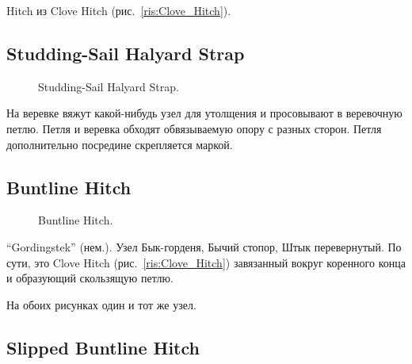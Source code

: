 Hitch из Clove Hitch (рис.~\ref{ris:Clove_Hitch}).

\subsection{Studding-Sail Halyard Strap}

\begin{figure}[H]\centering
	\begin{minipage}{1\linewidth}
		\begin{center}
			\tcbox[enhanced jigsaw,colframe=black,opacityframe=0.5,opacityback=0.5]
			{\centering{}}
		\end{center}
	\end{minipage}
\caption{Studding-Sail Halyard Strap.}
\label{ris:Studding-Sail_Halyard_Strap}
\end{figure}

На веревке вяжут какой-нибудь узел для утолщения и просовывают в веревочную петлю. Петля и веревка обходят обвязываемую опору с разных сторон. Петля дополнительно посредине скрепляется маркой.

\subsection{Buntline Hitch}

\begin{figure}[H]\centering
\hfil
	\caption{Buntline Hitch.}\label{ris:Buntline_Hitch}
\end{figure}


\enquote{Gordingstek} (нем.). Узел Бык-горденя, Бычий стопор, Штык перевернутый. По сути, это Clove Hitch (рис.~\ref{ris:Clove_Hitch}) завязанный вокруг коренного конца и образующий скользящую петлю.

На обоих рисунках один и тот же узел.

\subsection{Slipped Buntline Hitch}

